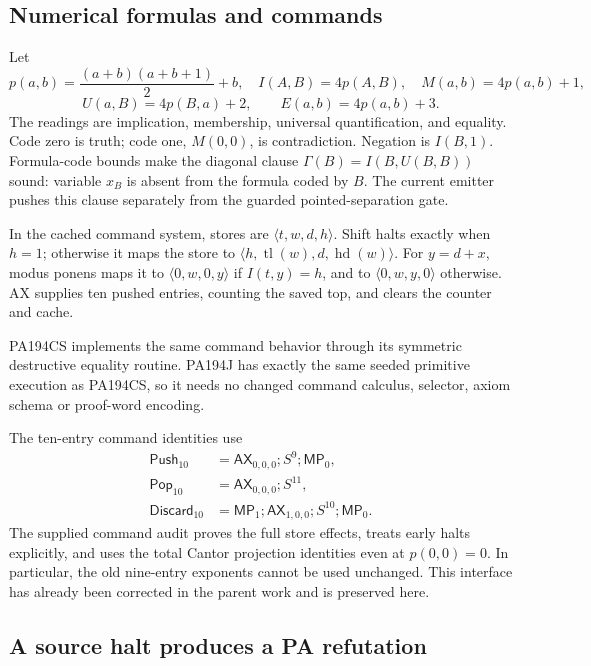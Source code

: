 \documentclass[11pt,letterpaper]{article}
\begin{document}
\subsection{Numerical formulas and commands}

Let
\[
 p(a,b)=\frac{(a+b)(a+b+1)}2+b,
 \quad I(A,B)=4p(A,B),\quad M(a,b)=4p(a,b)+1,
\]
\[
 U(a,B)=4p(B,a)+2,\qquad E(a,b)=4p(a,b)+3.
\]
The readings are implication, membership, universal quantification, and
equality. Code zero is truth; code one, \(M(0,0)\), is contradiction.
Negation is \(I(B,1)\). Formula-code bounds make the diagonal clause
\(\Gamma(B)=I(B,U(B,B))\) sound: variable \(x_B\) is absent from the
formula coded by \(B\). The current emitter pushes this clause
separately from the guarded pointed-separation gate.

In the cached command system, stores are \(\langle t,w,d,h\rangle\).
Shift halts exactly when \(h=1\); otherwise it maps the store to
\(\langle h,\operatorname{tl}(w),d,\operatorname{hd}(w)\rangle\).
For \(y=d+x\), modus ponens maps it to
\(\langle0,w,0,y\rangle\) if \(I(t,y)=h\), and to
\(\langle0,w,y,0\rangle\) otherwise. AX supplies ten pushed entries,
counting the saved top, and clears the counter and cache.

PA194CS implements the same command behavior through its symmetric
destructive equality routine. PA194J has exactly the same seeded
primitive execution as PA194CS, so it needs no changed command calculus,
selector, axiom schema or proof-word encoding.

The ten-entry command identities use
\[
\begin{aligned}
 \mathsf{Push}_{10}&=\mathsf{AX}_{0,0,0};S^9;\mathsf{MP}_0,\\
 \mathsf{Pop}_{10}&=\mathsf{AX}_{0,0,0};S^{11},\\
 \mathsf{Discard}_{10}&=\mathsf{MP}_1;\mathsf{AX}_{1,0,0};S^{10};\mathsf{MP}_0.
\end{aligned}
\]
The supplied command audit proves the full store effects, treats early
halts explicitly, and uses the total Cantor projection identities even
at \(p(0,0)=0\). In particular, the old nine-entry exponents cannot be
used unchanged. This interface has already been corrected in the parent
work and is preserved here.

\subsection{A source halt produces a PA refutation}
\end{document}
